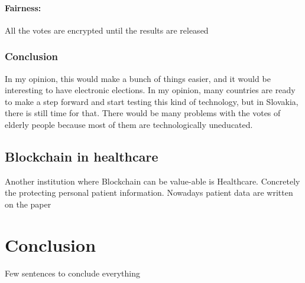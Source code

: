 \documentclass[10pt,english,a4paper]{article}
\begin{document}
\paragraph{Fairness:}
All the votes are encrypted until the results are released
\cite{Alvi:E-voting}



\subsubsection{Conclusion}
In my opinion, this would make a bunch of things easier, and it would be interesting to have electronic elections. In my opinion, many countries are ready to make a step forward and start testing this kind of technology, but in Slovakia, there is still time for that. There would be many problems with the votes of elderly people because most of them are technologically uneducated.

\subsection{Blockchain in healthcare}
Another institution where Blockchain can be value-able is Healthcare. Concretely the protecting personal patient information. Nowadays patient data are written on the paper 
\cite{Ramar:Healthcare}

\section{Conclusion}
Few sentences to conclude everything



\newpage


\end{document}
